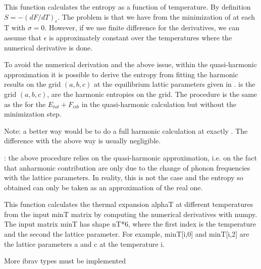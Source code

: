 \documentclass[letterpaper,10pt,english]{sphinxmanual}
\begin{document}
\begin{fulllineitems}
\label{pyqha:pyqha.properties_anis.compute_S}
This function calculates the entropy as a function of temperature. By definition
\(S = -(dF/dT)_{\epsilon}\). The problem is that we have  from the
minimization of  at each T with \(\sigma=0\). However, if we use finite
difference for the derivatives, we can assume that  \(\epsilon\) is 
approximately constant over the temperatures where the numerical derivative 
is done.

To avoid the numerical derivation and the above issue, within the quasi-harmonic
approximation it is possible to derive the entropy from fitting the harmonic 
results on the grid \((a,b,c)\) at the equilibrium lattic parameters given
in .  is the grid \((a,b,c)\),  are the harmonic 
entropies on the grid.
The procedure is the same as the for the \(E_{tot}+F_{vib}\) in the quasi-harmonic
calculation but without the minimization step.

Note: a better way would be to do a full harmonic calculation at exactly .
The difference with the above way is usually negligible.

: the above procedure relies on the quasi-harmonic approximation,
i.e. on the fact that anharmonic contribution are only due to the change of
phonon frequencies with the lattice parameters. In reality, this is not the 
case and the entropy so obtained can only be taken as an approximation of the
real one.

\end{fulllineitems}


\begin{fulllineitems}
\label{pyqha:pyqha.properties_anis.compute_alpha}
This function calculates the thermal expansion alphaT at different temperatures
from the input minT matrix by computing the numerical derivatives with numpy.
The input matrix minT has shape nT*6, where the first index is the temperature 
and the second the lattice parameter. For example, minT{[}i,0{]} and minT{[}i,2{]} are
the lattice parameters a and c at the temperature i.

More ibrav types must be implemented

\end{fulllineitems}
\end{document}
